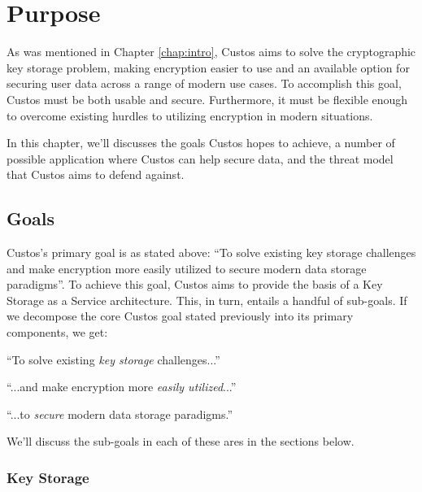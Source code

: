 \chapter{Purpose}
\label{chap:purpose}

As was mentioned in Chapter \ref{chap:intro}, Custos aims to solve the
cryptographic key storage problem, making encryption easier to use and
an available option for securing user data across a range of modern
use cases. To accomplish this goal, Custos must be both usable and
secure.  Furthermore, it must be flexible enough to overcome existing
hurdles to utilizing encryption in modern situations.

In this chapter, we'll discusses the goals Custos hopes to achieve, a
number of possible application where Custos can help secure data, and
the threat model that Custos aims to defend against.

\section{Goals}

Custos's primary goal is as stated above: ``To solve existing key
storage challenges and make encryption more easily utilized to secure
modern data storage paradigms''. To achieve this goal, Custos aims
to provide the basis of a Key Storage as a Service architecture. This,
in turn, entails a handful of sub-goals. If we decompose the core
Custos goal stated previously into its primary components, we get:

\begin{packed_desc}
\item[Provide Key Storage:] ``To solve existing \emph{key storage}
  challenges...''
\item[Easily Usable:] ``...and make encryption more \emph{easily
  utilized}...''
\item[Secure:] ``...to \emph{secure} modern data storage paradigms.''
\end{packed_desc}

We'll discuss the sub-goals in each of these ares in the sections below.

\subsection{Key Storage}

